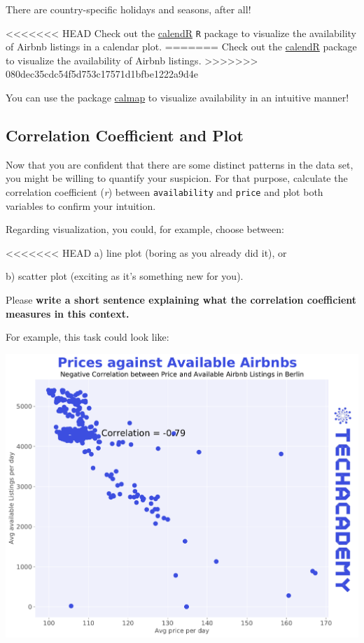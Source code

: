 \documentclass[
  11pt,
]{article}
\newenvironment{tips}[1]
  {
  \begin{itemize}
  \footnotesize
  \renewcommand{\labelitemi}{
    \raisebox{-.7\height}[0pt][0pt]{
      {\setkeys{Gin}{width=3em,keepaspectratio}
        \texttt{[image: images/\#1.png]}}
    }
  }
  \setlength{\fboxsep}{1em}
  \begin{rbox}
  \item
  }
  {
  \end{rbox}
  \end{itemize}
  }
\newenvironment{tipsp}[1]
  {
  \begin{itemize}
  \footnotesize
  \renewcommand{\labelitemi}{
    \raisebox{-.7\height}[0pt][0pt]{
      {\setkeys{Gin}{width=3em,keepaspectratio}
        \texttt{[image: images/\#1.png]}}
    }
  }
  \setlength{\fboxsep}{1em}
  \begin{pbox}
  \item
  }
  {
  \end{pbox}
  \end{itemize}
  }
\begin{document}
There are country-specific holidays and seasons, after all!

\begin{tips}r
<<<<<<< HEAD
Check out the \href{https://r-coder.com/calendar-plot-r/}{calendR} \texttt{R} package to visualize the availability of Airbnb listings in a calendar plot.
=======
Check out the \href{https://r-coder.com/calendar-plot-r/}{calendR} package to visualize the availability of Airbnb listings.
>>>>>>> 080dec35cdc54f5d753c17571d1bfbe1222a9d4e

\end{tips}

\begin{tipsp}p
You can use the package \href{https://pythonhosted.org/calmap/}{calmap} to visualize availability in an intuitive manner!

\end{tipsp}

\hypertarget{correlation-coefficient-and-plot}{%
\subsection{Correlation Coefficient and Plot}\label{correlation-coefficient-and-plot}}

Now that you are confident that there are some distinct patterns in the data set, you might be willing to quantify your suspicion.
For that purpose, calculate the correlation coefficient (\emph{r}) between \texttt{availability} and \texttt{price} and plot both variables to confirm your intuition.

Regarding visualization, you could, for example, choose between:

<<<<<<< HEAD
a) line plot (boring as you already did it), or

b) scatter plot (exciting as it's something new for you).

Please \textbf{write a short sentence explaining what the correlation coefficient measures in this context.}

For example, this task could look like:

\begin{center}\includegraphics[width=1\linewidth]{plot/01_python/corr_availability_price} \end{center}
\end{document}
